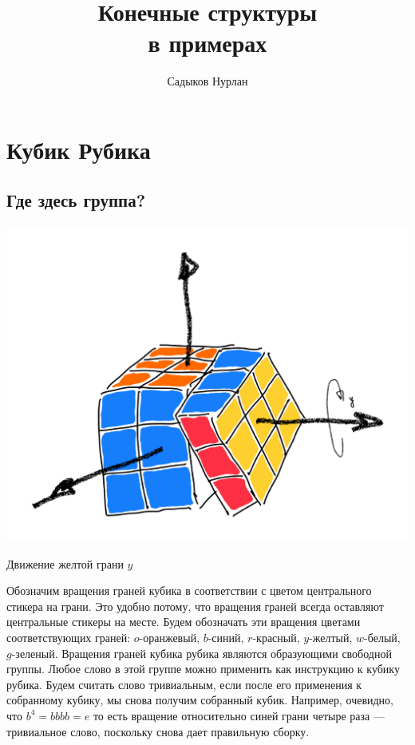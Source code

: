 \documentclass{tufte-book}
\title{Конечные структуры \\ {\Huge в примерах}} %
\author{Садыков Нурлан}
\begin{document}
\frontmatter

\maketitle  
\chapter{Кубик Рубика}
\section{Где здесь группа?}


\begin{marginfigure}
    \includegraphics[width=1.1\columnwidth]{../pics/rubik_single_move.pdf}
    \caption{Движение желтой грани $y$}
    \label{fig:move_y}
\end{marginfigure}


Обозначим вращения граней кубика в соответствии с
цветом центрального стикера на грани. Это удобно потому, что вращения граней
всегда оставляют центральные стикеры на месте. Будем обозначать эти вращения
цветами соответствующих граней: $o$-оранжевый, $b$-синий, $r$-красный,
$y$-желтый, $w$-белый, $g$-зеленый. Вращения граней кубика рубика являются
образующими свободной группы. Любое слово в этой группе можно применить как
инструкцию к кубику рубика. Будем считать слово тривиальным, если после его
применения к собранному кубику, мы снова получим собранный
кубик. Например, очевидно, что $b^4 = bbbb = e$ то
есть вращение относительно синей грани четыре раза --- тривиальное слово,
поскольку снова дает правильную сборку.
\end{document}

